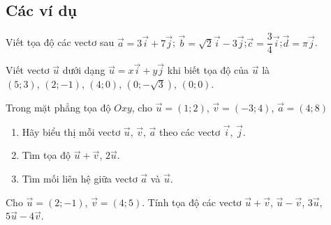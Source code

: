 \subsection{Các ví dụ}
\begin{vd}%
	Viết tọa độ các vectơ sau
	$\vec{a}=3\vec{i}+7\vec{j}$; \quad $\vec{b}=\sqrt{2}\vec{i}-3\vec{j}$;\quad $\vec{c}=\dfrac{3}{4}\vec{i}$;\quad$\vec{d}=\pi\vec{j}$.
\end{vd}
\begin{vd}%
	Viết vectơ $\vec{u}$ dưới dạng $\vec{u}=x\vec{i}+y\vec{j}$ khi biết tọa độ của $\vec{u}$ là\\
	$(5;3)$, $(2;-1)$, $(4;0)$, $\left(0;-\sqrt{3}\right)$, $(0;0)$.
\end{vd}
\begin{vd}%
	Trong mặt phẳng tọa độ $Oxy$, cho $\vec{u}=(1;2)$, $\vec{v}=(-3;4)$, $\vec{a}=(4;8)$
	\begin{enumerate}
		\item Hãy biểu  thị mỗi vectơ $\vec{u}$, $\vec{v}$, $\vec{a}$ theo các vectơ $\vec{i}$, $\vec{j}$.
		\item Tìm tọa độ $\vec{u}+\vec{v}$, $2\vec{u}$.
		\item Tìm mối liên hệ giữa vectơ $\vec{a}$ và $\vec{u}$.
	\end{enumerate}
\end{vd}
\begin{vd}%
	Cho $\vec{u}=(2;-1)$, $\vec{v}=(4;5)$. Tính tọa độ các vectơ $\vec{u}+\vec{v}$, $\vec{u}-\vec{v}$, $3\vec{u}$, $5\vec{u}-4\vec{v}$.
\end{vd}

